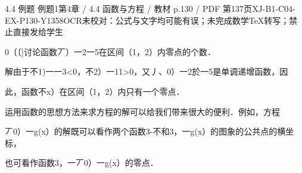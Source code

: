 \begin{bankitem}{4.4 例题 例题1}{第4章 / 4.4 函数与方程 / 教材 p.130 / PDF 第137页}{XJ-B1-C04-EX-P130-Y1358}{OCR未校对：公式与文字均可能有误；未完成数学TeX转写；禁止直接发给学生}
\begin{ocrdraft}
\par
0〔〔]讨论函数丆）一2一5在区间（1，2）内零点的个数．
\par
解由于不1)一一3<0，不2）一11>0，又丿、0）一2於一5是单调递增函数，因
\par
此，函数不x）在区间（1，2）内只有一个零点．
\par
运用函数的思想方法来求方程的解可以给我们带来很大的便利．例如，方程
\par
丆0）一g(x）的解既可以看作两个函数3-不和3，一g(x）的图象的公共点的横坐标，
\par
也可看作函数3，一丆0）一g(x）的零点．
\end{ocrdraft}
\end{bankitem}
